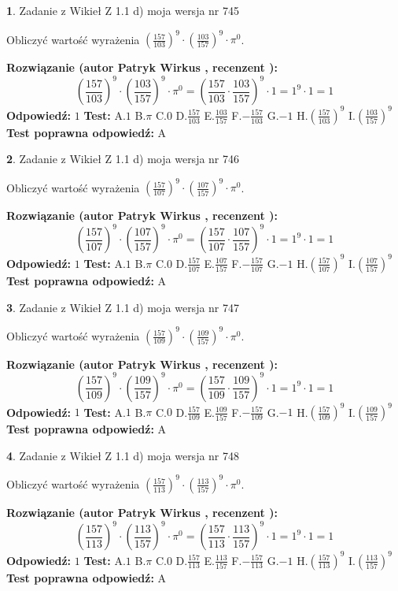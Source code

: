\documentclass[12pt, a4paper]{article}
\theoremstyle{definition} %
\newtheorem{zad}{}
\newcommand{\zadStart}[1]{\begin{zad}#1\newline}
\newcommand{\zadStop}{\end{zad}}
\newcommand{\rozwStart}[2]{\noindent \textbf{Rozwiązanie (autor #1 , recenzent #2): }\newline}
\newcommand{\rozwStop}{\newline}
\newcommand{\odpStart}{\noindent \textbf{Odpowiedź:}\newline}
\newcommand{\odpStop}{\newline}
\newcommand{\testStart}{\noindent \textbf{Test:}\newline}
\newcommand{\testStop}{\newline}
\newcommand{\kluczStart}{\noindent \textbf{Test poprawna odpowiedź:}\newline}
\newcommand{\kluczStop}{\newline}
\begin{document}
\zadStart{Zadanie z Wikieł Z 1.1 d) moja wersja nr 745}

Obliczyć wartość wyrażenia $(\frac{157}{103})^{9} \cdot (\frac{103}{157})^{9} \cdot \pi^{0}$.
\zadStop
\rozwStart{Patryk Wirkus}{}
$$(\frac{157}{103})^{9} \cdot (\frac{103}{157})^{9} \cdot \pi^{0} = (\frac{157}{103} \cdot \frac{103}{157})^{9} \cdot 1 = 1^{9} \cdot 1 = 1$$
\rozwStop
\odpStart
$1$
\odpStop
\testStart
A.$1$ B.$\pi$ C.$0$ D.$\frac{157}{103}$ E.$\frac{103}{157}$
F.$-\frac{157}{103}$ G.$-1$
H.$(\frac{157}{103})^{9}$
I.$(\frac{103}{157})^{9}$
\testStop
\kluczStart
A
\kluczStop



\zadStart{Zadanie z Wikieł Z 1.1 d) moja wersja nr 746}

Obliczyć wartość wyrażenia $(\frac{157}{107})^{9} \cdot (\frac{107}{157})^{9} \cdot \pi^{0}$.
\zadStop
\rozwStart{Patryk Wirkus}{}
$$(\frac{157}{107})^{9} \cdot (\frac{107}{157})^{9} \cdot \pi^{0} = (\frac{157}{107} \cdot \frac{107}{157})^{9} \cdot 1 = 1^{9} \cdot 1 = 1$$
\rozwStop
\odpStart
$1$
\odpStop
\testStart
A.$1$ B.$\pi$ C.$0$ D.$\frac{157}{107}$ E.$\frac{107}{157}$
F.$-\frac{157}{107}$ G.$-1$
H.$(\frac{157}{107})^{9}$
I.$(\frac{107}{157})^{9}$
\testStop
\kluczStart
A
\kluczStop



\zadStart{Zadanie z Wikieł Z 1.1 d) moja wersja nr 747}

Obliczyć wartość wyrażenia $(\frac{157}{109})^{9} \cdot (\frac{109}{157})^{9} \cdot \pi^{0}$.
\zadStop
\rozwStart{Patryk Wirkus}{}
$$(\frac{157}{109})^{9} \cdot (\frac{109}{157})^{9} \cdot \pi^{0} = (\frac{157}{109} \cdot \frac{109}{157})^{9} \cdot 1 = 1^{9} \cdot 1 = 1$$
\rozwStop
\odpStart
$1$
\odpStop
\testStart
A.$1$ B.$\pi$ C.$0$ D.$\frac{157}{109}$ E.$\frac{109}{157}$
F.$-\frac{157}{109}$ G.$-1$
H.$(\frac{157}{109})^{9}$
I.$(\frac{109}{157})^{9}$
\testStop
\kluczStart
A
\kluczStop



\zadStart{Zadanie z Wikieł Z 1.1 d) moja wersja nr 748}

Obliczyć wartość wyrażenia $(\frac{157}{113})^{9} \cdot (\frac{113}{157})^{9} \cdot \pi^{0}$.
\zadStop
\rozwStart{Patryk Wirkus}{}
$$(\frac{157}{113})^{9} \cdot (\frac{113}{157})^{9} \cdot \pi^{0} = (\frac{157}{113} \cdot \frac{113}{157})^{9} \cdot 1 = 1^{9} \cdot 1 = 1$$
\rozwStop
\odpStart
$1$
\odpStop
\testStart
A.$1$ B.$\pi$ C.$0$ D.$\frac{157}{113}$ E.$\frac{113}{157}$
F.$-\frac{157}{113}$ G.$-1$
H.$(\frac{157}{113})^{9}$
I.$(\frac{113}{157})^{9}$
\testStop
\kluczStart
A
\kluczStop
\end{document}
